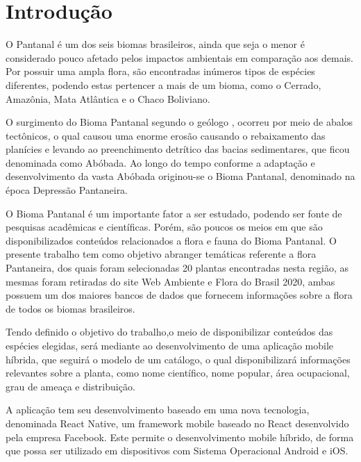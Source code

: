 \chapter{Introdução}


O Pantanal é um dos seis biomas brasileiros, ainda que seja o menor é considerado  pouco afetado pelos impactos ambientais em comparação aos demais. Por possuir uma ampla flora, são encontradas inúmeros tipos de espécies diferentes, podendo estas pertencer a mais de um bioma, como o Cerrado, Amazônia, Mata Atlântica e o Chaco Boliviano.

O surgimento do Bioma Pantanal segundo o geólogo , ocorreu por meio de abalos tectônicos, o qual causou uma enorme erosão causando o rebaixamento das planícies e levando ao preenchimento detrítico das bacias sedimentares, que ficou denominada como Abóbada. Ao longo do tempo conforme a adaptação e desenvolvimento da vasta Abóbada originou-se o Bioma Pantanal, denominado na época Depressão Pantaneira. 

O Bioma Pantanal é um importante fator a ser estudado, podendo ser fonte de pesquisas acadêmicas e científicas. Porém, são poucos os meios em que são disponibilizados  conteúdos relacionados a flora e fauna do Bioma Pantanal. O presente trabalho tem como objetivo abranger temáticas referente a flora Pantaneira, dos quais foram selecionadas 20 plantas encontradas nesta região, as mesmas foram retiradas do site Web Ambiente e Flora do Brasil 2020, ambas possuem um dos maiores bancos de dados que fornecem informações sobre a flora de todos os biomas brasileiros. 

Tendo definido o objetivo do trabalho,o meio de disponibilizar conteúdos das espécies elegidas, será mediante ao desenvolvimento de uma aplicação mobile híbrida, que seguirá o modelo de um catálogo, o qual disponibilizará informações relevantes sobre a planta, como nome científico, nome popular, área ocupacional, grau de ameaça  e distribuição.

A aplicação tem seu desenvolvimento baseado em uma nova tecnologia, denominada React Native, um framework mobile baseado no React desenvolvido pela empresa Facebook. Este permite o desenvolvimento mobile híbrido, de forma que possa ser utilizado em dispositivos com Sistema Operacional Android e iOS.


